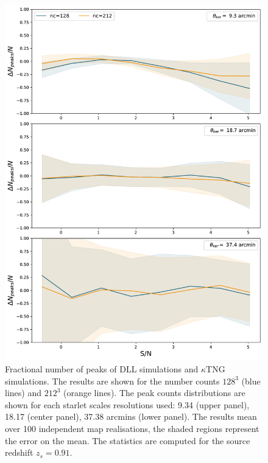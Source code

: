 \documentclass[twocolumn,twocolappendix]{aastex63}
\begin{document}
{\renewcommand{\thefigure}{C\arabic{figure}}
\setcounter{figure}{1}
\begin{figure}\label{peaks_high}
    \centering
    \includegraphics[width=\columnwidth]{paper/figures/res_peak_DLL_vs_ktng_high.pdf}
    \caption{Fractional number of peaks of DLL simulations and $\kappa$TNG simulations. The results are shown for the number counts $128^3$ (blue lines) and $212^3$ (orange lines). The peak counts distributions are shown for each starlet scales resolutions used: 9.34 (upper panel), 18.17 (center panel), 37.38 arcmins (lower panel).
  The results mean over 100 independent map realisations, the shaded regions represent the error on the mean. The statistics are computed for the source redshift $z_s=0.91$. }
\end{figure}

}
\end{document}

